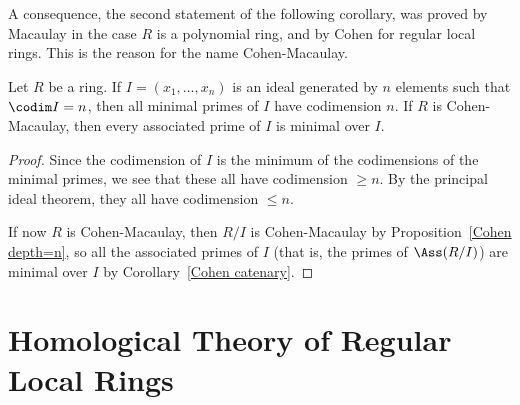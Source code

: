 A consequence, the second statement of the following corollary, was proved by Macaulay in the case $R$ is a polynomial ring, and by Cohen for regular local rings. This is the reason for the name Cohen-Macaulay.
\begin{corollary}
Let $R$ be a ring. If $I=(x_1,\dots,x_n)$ is an ideal generated by $n$ elements such that $\codim I=n$, then all minimal primes of $I$ have codimension $n$. If $R$ is Cohen-Macaulay, then every associated prime of $I$ is minimal over $I$.
\end{corollary}
\begin{proof}
Since the codimension of $I$ is the minimum of the codimensions of the minimal primes, we see that these all have codimension $\geq n$. By the
principal ideal theorem, they all have codimension $\leq n$.\par
If now $R$ is Cohen-Macaulay, then $R/I$ is Cohen-Macaulay by Proposition~\ref{Cohen depth=n}, so all the associated primes of $I$ (that is, the primes of $\Ass(R/I)$) are minimal over $I$ by Corollary~\ref{Cohen catenary}.
\end{proof}
\section{Homological Theory of Regular Local Rings}
